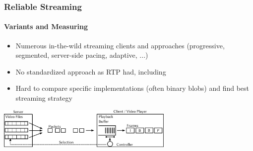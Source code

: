 \documentclass{beamer}
\begin{document}
\begin{frame}
	\frametitle{Reliable Streaming}
	\framesubtitle{Variants and Measuring}

	\begin{overlayarea}{\textwidth}{\textheight}
		\begin{itemize}
			\item Numerous in-the-wild streaming clients and approaches (progressive, segmented, server-side pacing, adaptive, ...)
			\item No standardized approach as RTP had, including
			\item Hard to compare specific implementations (often binary blobs) and find best streaming strategy
		\end{itemize}
		\vspace{-0.5cm}
		\begin{center}
			\includegraphics[height=2cm]{../../chapters/03-streaming/images/playback-model.pdf}
		\end{center}
		\vspace{-0.4cm}
	\end{overlayarea}
\end{frame}
\end{document}
